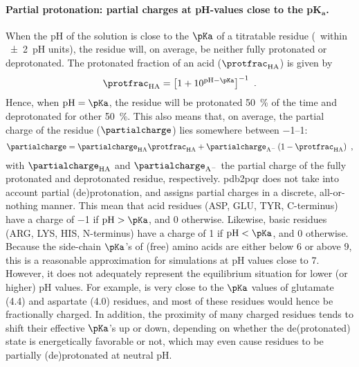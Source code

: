 \paragraph{Partial protonation: partial charges at pH-values close to the p$\boldsymbol{K}_{\mathbf{a}}$.}
%
%
When the pH of the solution is close to the $\pKa$ of a titratable residue (\ie~within \num{\pm2}~pH units),
the residue will, on average, be neither fully protonated or deprotonated. The protonated fraction of an acid
($\protfrac_{\mathrm{HA}}$) is given by 
%
\begin{align}\label{eq:pka_protonation}
  \protfrac_{\mathrm{HA}} = \left[ 1 + 10^{\mathrm{pH} - \pKa} \right]^{-1}
  \text{ .}
\end{align}
%
Hence, when $\mathrm{pH} = \pKa$, the residue will be protonated \SI{50}{\percent} of the time and
deprotonated for other \SI{50}{\percent}. This also means that, on average, the partial charge of the residue
($\partialcharge$) lies somewhere between \SIrange{-1}{+1}{\ec}:
%
\begin{align}\label{eq:pka_partial_charge}
  \partialcharge = \partialcharge_{\mathrm{HA}} \protfrac_{\mathrm{HA}}
                    + \partialcharge_{\mathrm{A}^{-}} \left( 1 - \protfrac_{\mathrm{HA}} \right)
  \text{ ,}
\end{align}
%
with $\partialcharge_{\mathrm{HA}}$ and $\partialcharge_{\mathrm{A}^{-}}$ the partial charge of the fully
protonated and deprotonated residue, respectively. \gls{pdb2pqr} does not take into account partial
(de)protonation, and assigns partial charges in a discrete, all-or-nothing manner. This mean that acid
residues (ASP, GLU, TYR, C-terminus) have a charge of \SI{-1}{\ec} if $\mathrm{pH} > \pKa$, and \SI{0}{\ec}
otherwise. Likewise, basic residues (ARG, LYS, HIS, N-terminus) have a charge of \SI{+1}{\ec} if $\mathrm{pH}
< \pKa$, and \SI{0}{\ec} otherwise. Because the side-chain $\pKa$'s of (free) amino acids are either below 6
or above 9, this is a reasonable approximation for simulations at pH values close to 7. However, it does not
adequately represent the equilibrium situation for lower (or higher) pH values. For example,  is very
close to the $\pKa$ values of glutamate (\num{4.4}) and aspartate (4.0) residues, and most of these residues
would hence be fractionally charged. In addition, the proximity of many charged residues tends to shift their
effective $\pKa$'s up or down, depending on whether the de(protonated) state is energetically favorable or
not, which may even cause residues to be partially (de)protonated at neutral pH.

